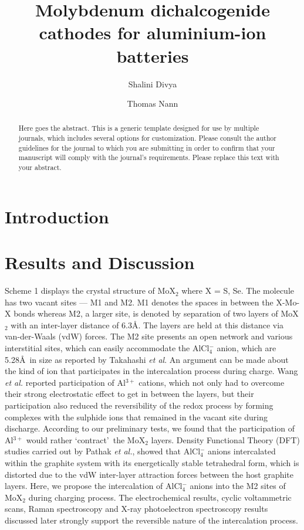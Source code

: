 \documentclass[num-refs]{wiley-article}
\title{Molybdenum dichalcogenide cathodes for aluminium-ion batteries}
\author[1]{Shalini Divya}
\author[2\authfn{1}]{Thomas Nann}
\affil[1]{Victoria University of Wellington, School of Chemical and Physical Sciences, Wellington, New Zealand}
\affil[2]{The University of Newcastle, School of Mathematical and Physical Sciences, Callaghan, NSW 2308, Australia}
\begin{document}
\maketitle

\begin{abstract}
Here goes the abstract. This is a generic template designed for use by multiple journals, which includes several options for customization. Please consult the author guidelines for the journal to which you are submitting in order to confirm that your manuscript will comply with the journal's requirements. Please replace this text with your abstract.


\end{abstract}

\section{Introduction}

\section{Results and Discussion}

Scheme 1 displays the crystal structure of MoX$_2$ where X = S, Se. The molecule has two vacant sites --- M1 and M2. M1 denotes the spaces in between the X-Mo-X bonds whereas M2, a larger site, is denoted by separation of two layers of MoX$_2$ with an inter-layer distance of 6.3\AA. The layers are held at this distance via van-der-Waals (vdW) forces. The M2 site presents an open network and various interstitial sites, which can easily accommodate the AlCl$_4^{-}$ anion, which are 5.28\AA\ in size as reported by Takahashi {\it et al}. An argument can be made about the kind of ion that participates in the intercalation process during charge. Wang {\it et al.} reported participation of Al$^{3+}$ cations, which not only had to overcome their strong electrostatic effect to get in between the layers, but their participation also reduced the reversibility of the redox process by forming complexes with the sulphide ions that remained in the vacant site during discharge. According to our preliminary tests, we found that the participation of Al$^{3+}$ would rather \lq contract\rq\ the MoX$_2$ layers. Density Functional Theory (DFT) studies carried out by Pathak {\it et al.}, showed that AlCl$_4^-$ anions intercalated within the graphite system with its energetically stable tetrahedral form, which is distorted due to the vdW inter-layer attraction forces between the host graphite layers. Here, we propose the intercalation of AlCl$_4^-$ anions into the M2 sites of MoX$_2$ during charging process. The electrochemical results, cyclic voltammetric scans, Raman spectroscopy and X-ray photoelectron spectroscopy results discussed later strongly support the reversible nature of the intercalation process.
\end{document}
